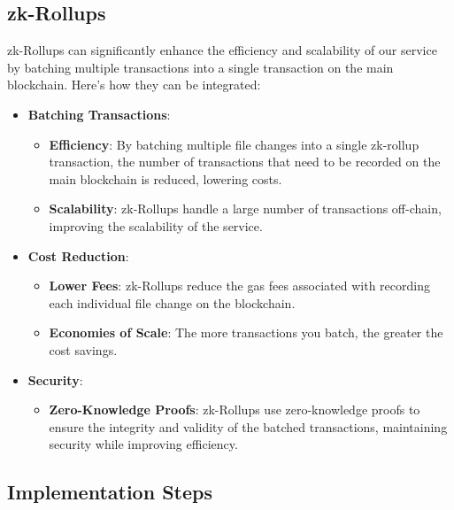\documentclass{tufte-handout}
\begin{document}
\subsection*{zk-Rollups}

zk-Rollups can significantly enhance the efficiency and scalability of our service by batching multiple transactions into a single transaction on the main blockchain.
Here's how they can be integrated:

\begin{itemize}
    \item \textbf{Batching Transactions}:
    \begin{itemize}
        \item \textbf{Efficiency}: By batching multiple file changes into a single zk-rollup transaction,
        the number of transactions that need to be recorded on the main blockchain is reduced, lowering costs.
        \item \textbf{Scalability}: zk-Rollups handle a large number of transactions off-chain, improving the scalability of the service.
    \end{itemize}
    \item \textbf{Cost Reduction}:
    \begin{itemize}
        \item \textbf{Lower Fees}: zk-Rollups reduce the gas fees associated with recording each individual file change on the blockchain.
        \item \textbf{Economies of Scale}: The more transactions you batch, the greater the cost savings.
    \end{itemize}
    \item \textbf{Security}:
    \begin{itemize}
        \item \textbf{Zero-Knowledge Proofs}: zk-Rollups use zero-knowledge proofs to ensure the integrity and validity of the batched transactions,
        maintaining security while improving efficiency.
    \end{itemize}
\end{itemize}

\subsection*{Implementation Steps}
\end{document}
